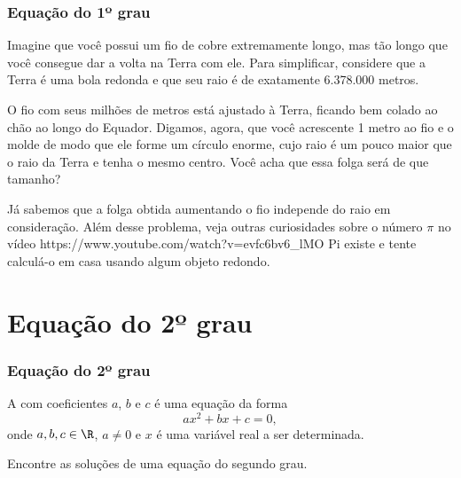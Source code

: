 \documentclass[brazil, notheorems, 10pt]{beamer}
\begin{document}

\begin{frame}
\frametitle{Equação do 1º grau} %

\begin{Exem}
Imagine que você possui um fio de cobre extremamente longo, mas tão
longo que você consegue dar a volta na Terra com ele. Para
simplificar, considere que a Terra é uma bola redonda e que seu raio
é de exatamente 6.378.000 metros.

O fio com seus milhões de metros está ajustado à Terra, ficando bem
colado ao chão ao longo do Equador. Digamos, agora, que você
acrescente 1 metro ao fio e o molde de modo que ele forme um círculo
enorme, cujo raio é um pouco maior que o raio da Terra e tenha o
mesmo centro. Você acha que essa folga será de que tamanho?
\end{Exem}

\pause Já sabemos que a folga obtida aumentando o fio independe do
raio em consideração. Além desse problema, veja outras curiosidades
sobre o número $\pi$ no vídeo \link
{https://www.youtube.com/watch?v=evfc6bv6_lM}{O Pi existe} e tente
calculá-o em casa usando algum objeto redondo.


\end{frame}

\section{Equação do 2º grau}
\begin{frame}
\frametitle{Equação do 2º grau} %

\begin{Def}
A  com coeficientes $a$, $b$ e $c$ é
uma equação da forma $$ax^2 + bx + c = 0,$$ onde $a, b, c \in \R$,
$a \neq 0$ e $x$ é uma variável real a ser determinada.
\end{Def}

\begin{Exem}
Encontre as soluções de uma equação do segundo grau.
\end{Exem}

\end{frame}

\end{document}
